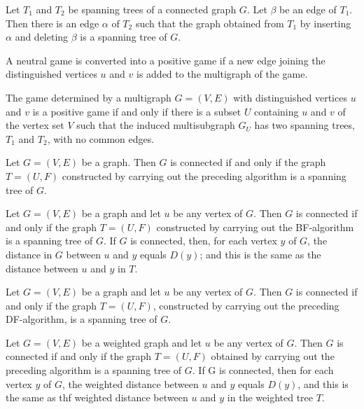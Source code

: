 \begin{theorem}
  \label{thm:11.5.9}
  Let $T_1$ and $T_2$ be spanning trees of a connected graph $G$. Let $\beta$ be an edge of $T_1$. 
  Then there is an edge $\alpha$ of $T_2$ such that the graph obtained from $T_1$ by inserting 
  $\alpha$ and deleting $\beta$ is a spanning tree of $G$.
\end{theorem}

\begin{theorem}
  \label{thm:11.6.1}
  A neutral game is converted into a positive game if a new edge joining the distinguished vertices 
  $u$ and $v$ is added to the multigraph of the game.
\end{theorem}

\begin{theorem}
  \label{thm:11.6.2}
  The game determined by a multigraph $G = (V, E)$ with distinguished vertices $u$ and $v$ is a 
  positive game if and only if there is a subset $U$ containing $u$ and $v$ of the vertex set $V$ 
  such that the induced multisubgraph $G_U$ has two spanning trees, $T_1$ and $T_2$, with no common 
  edges.
\end{theorem}

\begin{theorem}
  \label{thm:11.7.1}
  Let $G = (V, E)$ be a graph. Then $G$ is connected if and only if the graph $T = (U, F)$ 
  constructed by carrying out the preceding algorithm is a spanning tree of $G$.
\end{theorem}

\begin{theorem}
  \label{thm:11.7.2}
  Let $G = (V, E)$ be a graph and let $u$ be any vertex of $G$. Then $G$ is connected if and only if
  the graph $T = (U, F)$ constructed by carrying out the BF-algorithm is a spanning tree of $G$. If 
  $G$ is connected, then, for each vertex $y$ of $G$, the distance in $G$ between $u$ and $y$ equals
  $D(y)$; and this is the same as the distance between $u$ and $y$ in $T$.
\end{theorem}

\begin{theorem}
  \label{thm:11.7.3}
  Let $G = (V, E)$ be a graph and let $u$ be any vertex of $G$. Then $G$ is connected if and only if
  the graph $T = (U, F)$, constructed by carrying out the preceding DF-algorithm, is a spanning tree
  of $G$.
\end{theorem}

\begin{theorem}
  \label{thm:11.7.4}
  Let $G = (V, E)$ be a weighted graph and let $u$ be any vertex of $G$. Then $G$ is connected if 
  and only if the graph $T = (U, F)$ obtained by carrying out the preceding algorithm is a spanning
  tree of $G$. If G is connected, then for each vertex $y$ of $G$, the weighted distance between $u$
  and $y$ equals $D(y)$, and this is the same as thf weighted distance between $u$ and $y$ in the 
  weighted tree $T$.
\end{theorem}

